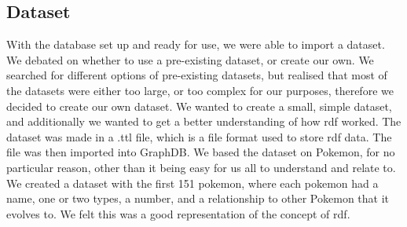 \subsection{Dataset}\label{sec:dataset}
With the database set up and ready for use, we were able to import a dataset. We debated on whether to use a pre-existing dataset, or create our own. We searched for different options of pre-existing datasets, but realised that most of the datasets were either too large, or too complex for our purposes, therefore we decided to create our own dataset. We wanted to create a small, simple dataset, and additionally we wanted to get a better understanding of how \gls{rdf} worked. The dataset was made in a .ttl file, which is a file format used to store \gls{rdf} data. The file was then imported into GraphDB.
We based the dataset on Pokemon, for no particular reason, other than it being easy for us all to understand and relate to. We created a dataset with the first 151 pokemon, where each pokemon had a name, one or two types, a number, and a relationship to other Pokemon that it evolves to. We felt this was a good representation of the concept of \gls{rdf}.






